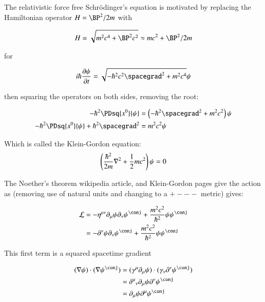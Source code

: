 The relativistic force free Schr\"{o}dinger's equation is motivated by \citep{srednicki2007qft} replacing the Hamiltonian operator $H = \BP^2/{2 m}$ with

\begin{align*}
H = \sqrt{m^2 c^4 + \BP^2 c^2} \approx m c^2 + \BP^2/2m
\end{align*}

for

\begin{align*}
i \hbar \PD{t}{\psi} = \sqrt{ -\hbar^2 c^2 \spacegrad^2 + m^2 c^4} \psi
\end{align*}

then squaring the operators on both sides, removing the root:

\begin{align*}
- \hbar^2 \PDsq{x^0}{\psi} &= \left(-\hbar^2 \spacegrad^2 + m^2 c^2 \right) \psi \\
- \hbar^2 \PDsq{x^0}{\psi} + \hbar^2 \spacegrad^2 &= m^2 c^2 \psi \\
\end{align*}

Which is called the Klein-Gordon equation:
\begin{align*}
\left(\frac{\hbar^2}{2m} \nabla^2 + \frac{1}{2} m c^2\right) \psi = 0 \\
\end{align*}

The Noether's theorem wikipedia article, and Klein-Gordon pages give the action
as (removing use of natural units and changing to a $+---$ metric) gives:

\begin{align*}
\LL &= -\eta^{\mu\nu} \partial_\mu \psi \partial_\nu \psi^\conj + \frac{m^2 c^2}{\hbar^2} \psi \psi^\conj \\
&= -\partial^\nu \psi \partial_\nu \psi^\conj + \frac{m^2 c^2}{\hbar^2} \psi \psi^\conj \\
\end{align*}

This first term is a squared spacetime gradient

\begin{align*}
(\grad \psi) \cdot (\grad \psi^\conj) 
&= (\gamma^\mu \partial_\mu \psi) \cdot (\gamma_\nu \partial^\nu \psi^\conj) \\
&= {\delta^\mu}_\nu \partial_\mu \psi \partial^\nu \psi^\conj \\
&= \partial_\mu \psi \partial^\mu \psi^\conj \\
\end{align*}

